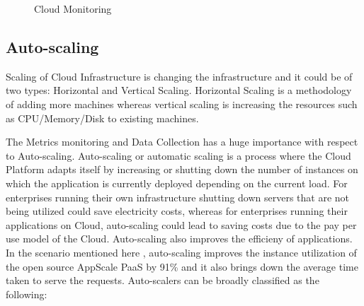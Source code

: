 \documentclass[article,type=msc,colorback,12pt,accentcolor=tud7b]{tudthesis}
\begin{document}
\begin{figure}
 \begin{center}
  \makebox[\textwidth]{\texttt{[image: B5]}}
\end{center}
\caption{Cloud Monitoring \cite{aceto2013cloud}}
\end{figure}	
	
	\subsection{Auto-scaling}	
	
	Scaling of Cloud Infrastructure is changing the infrastructure and it could be of two types: Horizontal and Vertical Scaling. Horizontal Scaling is a methodology of adding more machines whereas vertical scaling is increasing the resources such as CPU/Memory/Disk to existing machines.
	
	The Metrics monitoring and Data Collection has a huge importance with respect to Auto-scaling. Auto-scaling or automatic scaling is a process where the Cloud Platform adapts itself by increasing or shutting down the number of instances on which the application is currently deployed depending on the current load. For enterprises running their own infrastructure shutting down servers that are not being utilized could save electricity costs, whereas for enterprises running their applications on Cloud, auto-scaling could lead to saving costs due to the pay per use model of the Cloud. Auto-scaling also improves the efficieny of applications. In the scenario mentioned here \cite{bunch2012pluggable}, auto-scaling improves the instance utilization of the open source AppScale PaaS by 91\% and it also brings down the average time taken to serve the requests. Auto-scalers can be broadly classified as the following: 
	
\end{document}
